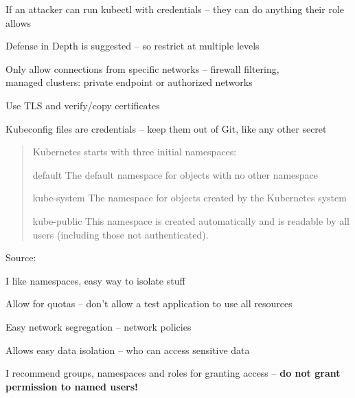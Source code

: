 \documentclass[Screen16to9,17pt]{foils}
\begin{document}
\begin{list2}
\item If an attacker can run kubectl with credentials -- they can do anything their role allows
\item Defense in Depth is suggested -- so restrict at multiple levels
\item Only allow connections from specific networks -- firewall filtering,\\
managed clusters: private endpoint or authorized networks
\item Use TLS and verify/copy certificates
\item Kubeconfig files are credentials -- keep them out of Git, like any other secret
\end{list2}



\begin{quote}
Kubernetes starts with three initial namespaces:
\begin{list2}
\item[*] default The default namespace for objects with no other namespace
\item[*] kube-system The namespace for objects created by the Kubernetes system
\item[*] kube-public This namespace is created automatically and is readable by all users (including those not authenticated).
\end{list2}
\end{quote}
Source: 

\begin{list2}
\item I like namespaces, easy way to isolate stuff
\item Allow for quotas -- don't allow a test application to use all resources
\item Easy network segregation -- network policies
\item Allows easy data isolation -- who can access sensitive data
\item I recommend groups, namespaces and roles for granting access -- {\bf do not grant permission to named users!}
\end{list2}


\end{document}
